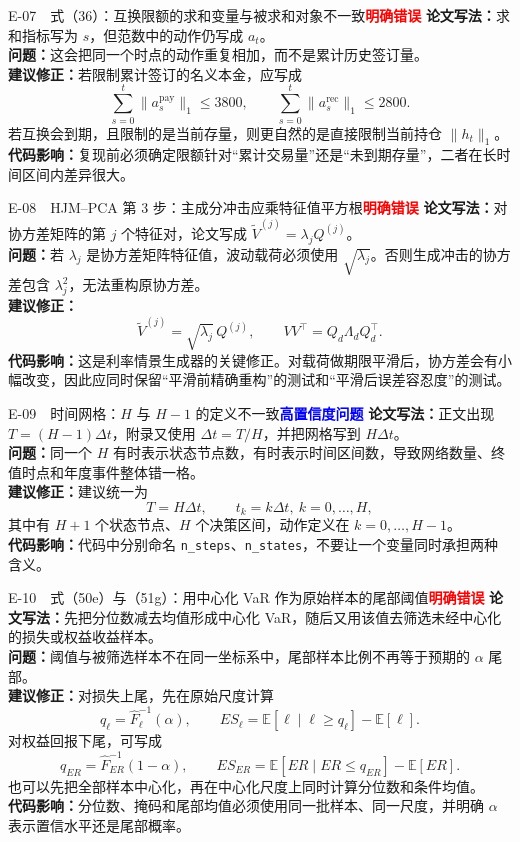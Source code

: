 \documentclass[UTF8,11pt,a4paper,fontset=fandol]{ctexart}
\newcommand{\tagdefinite}{\textcolor{red}{\textbf{明确错误}}}
\newcommand{\taghigh}{\textcolor{blue}{\textbf{高置信度问题}}}
\newcommand{\original}{\textbf{论文写法：}}
\newcommand{\problem}{\textbf{问题：}}
\newcommand{\revision}{\textbf{建议修正：}}
\newcommand{\impact}{\textbf{代码影响：}}
\begin{document}
\begin{fixbox}{E-07　式（36）：互换限额的求和变量与被求和对象不一致\hfill\tagdefinite}
\original 求和指标写为 $s$，但范数中的动作仍写成 $a_t$。\\
\problem 这会把同一个时点的动作重复相加，而不是累计历史签订量。\\
\revision 若限制累计签订的名义本金，应写成
\[
 \sum_{s=0}^{t}\lVert a_s^{\mathrm{pay}}\rVert_1\le 3800,
 \qquad
 \sum_{s=0}^{t}\lVert a_s^{\mathrm{rec}}\rVert_1\le 2800.
\]
若互换会到期，且限制的是当前存量，则更自然的是直接限制当前持仓 $\lVert h_t\rVert_1$。\\
\impact 复现前必须确定限额针对“累计交易量”还是“未到期存量”，二者在长时间区间内差异很大。
\end{fixbox}

\begin{fixbox}{E-08　HJM--PCA 第 3 步：主成分冲击应乘特征值平方根\hfill\tagdefinite}
\original 对协方差矩阵的第 $j$ 个特征对，论文写成 $\widetilde V^{(j)}=\lambda_jQ^{(j)}$。\\
\problem 若 $\lambda_j$ 是协方差矩阵特征值，波动载荷必须使用 $\sqrt{\lambda_j}$。否则生成冲击的协方差包含 $\lambda_j^2$，无法重构原协方差。\\
\revision
\[
  \widetilde V^{(j)}=\sqrt{\lambda_j}\,Q^{(j)},
  \qquad
  VV^\top=Q_d\Lambda_dQ_d^\top.
\]
\impact 这是利率情景生成器的关键修正。对载荷做期限平滑后，协方差会有小幅改变，因此应同时保留“平滑前精确重构”的测试和“平滑后误差容忍度”的测试。
\end{fixbox}

\begin{fixbox}{E-09　时间网格：$H$ 与 $H-1$ 的定义不一致\hfill\taghigh}
\original 正文出现 $T=(H-1)\Delta t$，附录又使用 $\Delta t=T/H$，并把网格写到 $H\Delta t$。\\
\problem 同一个 $H$ 有时表示状态节点数，有时表示时间区间数，导致网络数量、终值时点和年度事件整体错一格。\\
\revision 建议统一为
\[
  T=H\Delta t,\qquad t_k=k\Delta t,\ k=0,\ldots,H,
\]
其中有 $H+1$ 个状态节点、$H$ 个决策区间，动作定义在 $k=0,\ldots,H-1$。\\
\impact 代码中分别命名 \texttt{n\_steps}、\texttt{n\_states}，不要让一个变量同时承担两种含义。
\end{fixbox}

\begin{fixbox}{E-10　式（50e）与（51g）：用中心化 VaR 作为原始样本的尾部阈值\hfill\tagdefinite}
\original 先把分位数减去均值形成中心化 VaR，随后又用该值去筛选未经中心化的损失或权益收益样本。\\
\problem 阈值与被筛选样本不在同一坐标系中，尾部样本比例不再等于预期的 $\alpha$ 尾部。\\
\revision 对损失上尾，先在原始尺度计算
\[
 q_\ell=\widehat F_\ell^{-1}(\alpha),\qquad
 ES_\ell=\mathbb E[\ell\mid \ell\ge q_\ell]-\mathbb E[\ell].
\]
对权益回报下尾，可写成
\[
 q_{ER}=\widehat F_{ER}^{-1}(1-\alpha),\qquad
 ES_{ER}=\mathbb E[ER\mid ER\le q_{ER}]-\mathbb E[ER].
\]
也可以先把全部样本中心化，再在中心化尺度上同时计算分位数和条件均值。\\
\impact 分位数、掩码和尾部均值必须使用同一批样本、同一尺度，并明确 $\alpha$ 表示置信水平还是尾部概率。
\end{fixbox}
\end{document}
